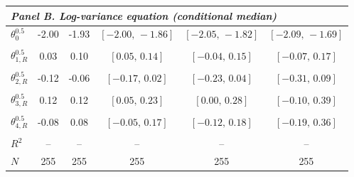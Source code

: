 \documentclass[11pt]{article}
\begin{document}
\begin{table}[!htbp]
\begin{threeparttable}
\begin{tabular}{lccccc}
\midrule
\multicolumn{6}{l}{\textit{Panel B. Log-variance equation (conditional median)}} \\
\midrule
$\theta^{0.5}_0$ & -2.00 & -1.93 & $[-2.00,\,-1.86]$ & $[-2.05,\,-1.82]$ & $[-2.09,\,-1.69]$ \\
 &  &  &  &  &  \\
\midrule
$\theta^{0.5}_{1,R}$ & 0.03 & 0.10 & $[0.05,\,0.14]$ & $[-0.04,\,0.15]$ & $[-0.07,\,0.17]$ \\
 &  &  &  &  &  \\
$\theta^{0.5}_{2,R}$ & -0.12 & -0.06 & $[-0.17,\,0.02]$ & $[-0.23,\,0.04]$ & $[-0.31,\,0.09]$ \\
 &  &  &  &  &  \\
$\theta^{0.5}_{3,R}$ & 0.12 & 0.12 & $[0.05,\,0.23]$ & $[0.00,\,0.28]$ & $[-0.10,\,0.39]$ \\
 &  &  &  &  &  \\
$\theta^{0.5}_{4,R}$ & -0.08 & 0.08 & $[-0.05,\,0.17]$ & $[-0.12,\,0.18]$ & $[-0.19,\,0.36]$ \\
 &  &  &  &  &  \\
\midrule
$R^2$ & -- & -- & -- & -- & -- \\
$N$ & 255 & 255 & 255 & 255 & 255 \\
\bottomrule
\end{tabular}
\begin{tablenotes}[flushleft]
\scriptsize

\end{tablenotes}
\end{threeparttable}
\end{table}
\end{document}
